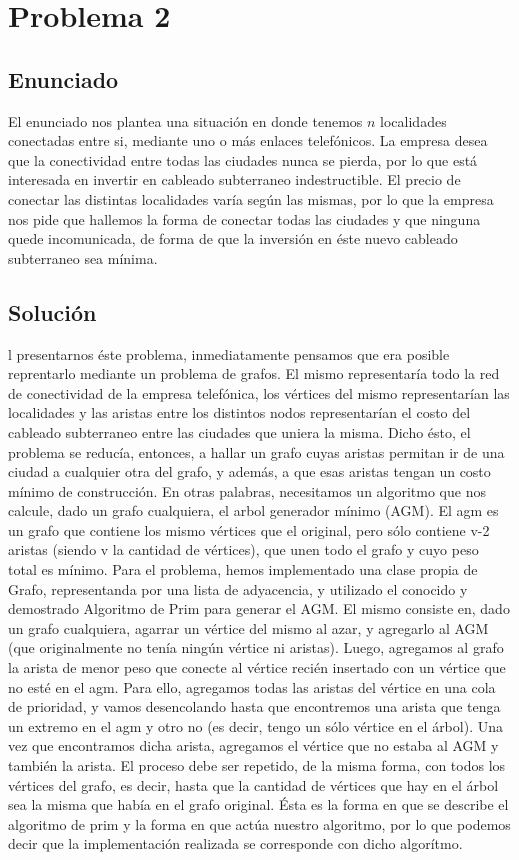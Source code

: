 \section{Problema 2}

\subsection{Enunciado}
El enunciado nos plantea una situación en donde tenemos $n$ localidades conectadas entre si, mediante uno o más enlaces telefónicos. La empresa desea que la conectividad entre todas las ciudades nunca se pierda, por lo que está interesada en invertir en cableado subterraneo indestructible. El precio de conectar las distintas localidades varía según las mismas, por lo que la empresa nos pide que hallemos la forma de conectar todas las ciudades y que ninguna quede incomunicada, de forma de que la inversión en éste nuevo cableado subterraneo sea mínima.

\subsection{Soluci\'on}
l presentarnos éste problema, inmediatamente pensamos que era posible reprentarlo mediante un problema de grafos. El mismo representaría todo la red de conectividad de la empresa telefónica, los vértices del mismo representarían las localidades y las aristas entre los distintos nodos representarían el costo del cableado subterraneo entre las ciudades que uniera la misma.
Dicho ésto, el problema se reducía, entonces, a hallar un grafo cuyas aristas permitan ir de una ciudad a cualquier otra del grafo, y además, a que esas aristas tengan un costo mínimo de construcción. En otras palabras, necesitamos un algoritmo que nos calcule, dado un grafo cualquiera, el arbol generador mínimo (AGM). El agm es un grafo que contiene los mismo vértices que el original, pero sólo contiene v-2 aristas (siendo v la cantidad de vértices), que unen todo el grafo y cuyo peso total es mínimo.
Para el problema, hemos implementado una clase propia de Grafo, representanda por una lista de adyacencia, y utilizado el conocido y demostrado Algoritmo de Prim para generar el AGM. El mismo consiste en, dado un grafo cualquiera, agarrar un vértice del mismo al azar, y agregarlo al AGM (que originalmente no tenía ningún vértice ni aristas). Luego, agregamos al grafo la arista de menor peso que conecte al vértice recién insertado con un vértice que no esté en el agm. Para ello, agregamos todas las aristas del vértice en una cola de prioridad, y vamos desencolando hasta que encontremos una arista que tenga un extremo en el agm y otro no (es decir, tengo un sólo vértice en el árbol). Una vez que encontramos dicha arista, agregamos el vértice que no estaba al AGM y también la arista. El proceso debe ser repetido, de la misma forma, con todos los vértices del grafo, es decir, hasta que la cantidad de vértices que hay en el árbol sea la misma que había en el grafo original. Ésta es la forma en que se describe el algoritmo de prim y la forma en que actúa nuestro algoritmo, por lo que podemos decir que la implementación realizada se corresponde con dicho algorítmo.

